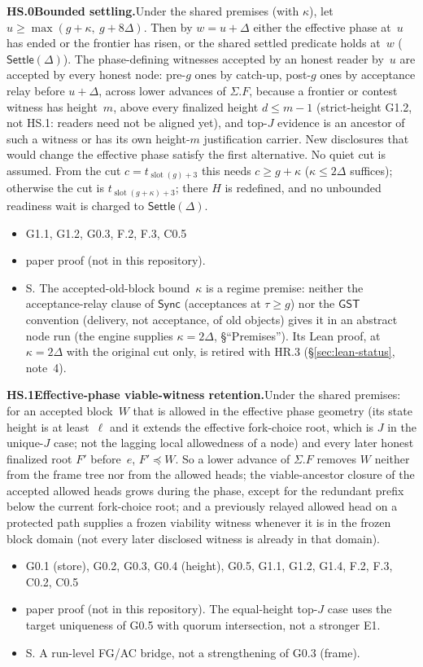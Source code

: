 \documentclass{article}
\newcommand{\slot}{\operatorname{slot}}
\newcommand{\dagnode}[6]{%
\par\medskip\noindent\textbf{#1\enspace #2.}\enspace #3
\begin{itemize}[leftmargin=2.2em,itemsep=0pt,topsep=2pt]
\item[\emph{Uses}] #4
\item[\emph{Evid.}] #5
\item[\emph{Task}] #6
\end{itemize}}
\begin{document}
\dagnode{HS.0}{Bounded settling}{Under the shared premises (with $\kappa$),
let $u\geq\max(g+\kappa,\ g+8\Delta)$.  Then by $w=u+\Delta$ either the
effective phase at~$u$ has ended or the frontier has risen, or the shared
settled predicate holds at~$w$ ($\mathsf{Settle}(\Delta)$).  The phase-defining
witnesses accepted by an honest reader by~$u$ are accepted by every honest
node: pre-$g$ ones by
catch-up, post-$g$ ones by acceptance relay before $u+\Delta$, across lower
advances of $\Sigma.F$, because a frontier or contest witness has height~$m$,
above every finalized height $d\leq m-1$ (strict-height G1.2, not HS.1:
readers need not be aligned yet), and top-$J$ evidence is an ancestor of such
a witness or has its own height-$m$ justification carrier.  New disclosures
that would change the effective phase satisfy the first alternative.  No quiet
cut is assumed.  From the cut $c=t_{\slot(g)+3}$ this needs $c\geq g+\kappa$
($\kappa\leq2\Delta$ suffices); otherwise the cut is
$t_{\slot(g+\kappa)+3}$; there $H$ is redefined, and no unbounded readiness
wait is charged to $\mathsf{Settle}(\Delta)$.}
{G1.1, G1.2, G0.3, F.2, F.3, C0.5}{paper proof (not in this repository).}{S.  The
accepted-old-block bound~$\kappa$ is a regime premise: neither the
acceptance-relay clause of $\mathsf{Sync}$ (acceptances at $\tau\geq g$) nor
the $\mathsf{GST}$ convention (delivery, not acceptance, of old objects)
gives it in an abstract node run (the engine supplies $\kappa=2\Delta$,
\S``Premises'').  Its Lean proof, at $\kappa=2\Delta$ with the original cut
only, is retired with HR.3 (\S\ref{sec:lean-status}, note~4).}

\dagnode{HS.1}{Effective-phase viable-witness retention}{Under the shared
premises: for an accepted block~$W$ that is allowed in the effective phase
geometry (its state height is at least~$\ell$ and it extends the effective
fork-choice root, which is $J$ in the unique-$J$ case; not the lagging local
allowedness of a node) and every later honest finalized root $F'$ before~$e$,
$F'\preceq W$.  So a lower advance of $\Sigma.F$ removes $W$ neither from the
frame tree nor from the allowed heads; the viable-ancestor closure of the
accepted allowed heads grows during the phase, except for the redundant
prefix below the current fork-choice root; and a previously relayed allowed
head on a protected path supplies a frozen viability witness whenever it is
in the frozen block domain (not every later disclosed witness is already in
that domain).}
{G0.1 (store), G0.2, G0.3, G0.4 (height), G0.5, G1.1, G1.2, G1.4, F.2, F.3,
C0.2, C0.5}{paper proof (not in this repository).  The equal-height top-$J$ case uses the
target uniqueness of G0.5 with quorum intersection, not a stronger E1.}{S.  A
run-level FG/AC bridge, not a strengthening of G0.3 (frame).}
\end{document}
